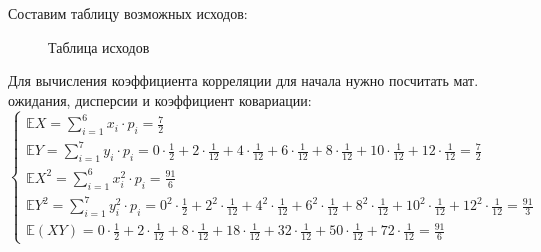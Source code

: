 \documentclass{article}
\begin{document}
\begin{enumerate}
Составим таблицу возможных исходов:
\begin{center}
  \begin{figure}[h]
    \centering
    \caption{Таблица исходов}
  \end{figure}
\end{center}
Для вычисления коэффициента корреляции для начала нужно посчитать мат. ожидания, дисперсии и коэффициент ковариации:
\begin{equation}
  \begin{cases}
    \mathbb{E}X = \sum_{i=1}^{6} x_i \cdot p_i = \frac{7}{2} \\
    \mathbb{E}Y = \sum_{i=1}^{7} y_i \cdot p_i = 0 \cdot \frac{1}{2} + 2 \cdot \frac{1}{12} + 4 \cdot \frac{1}{12} + 6 \cdot \frac{1}{12} + 8 \cdot \frac{1}{12} + 10 \cdot \frac{1}{12} + 12 \cdot \frac{1}{12} = \frac{7}{2} \\
    \mathbb{E}X^2 = \sum_{i=1}^{6} x_i^2 \cdot p_i = \frac{91}{6} \\
    \mathbb{E}Y^2 = \sum_{i=1}^{7} y_i^2 \cdot p_i = 0^2 \cdot \frac{1}{2} + 2^2 \cdot \frac{1}{12} + 4^2 \cdot \frac{1}{12} + 6^2 \cdot \frac{1}{12} + 8^2 \cdot \frac{1}{12} + 10^2 \cdot \frac{1}{12} + 12^2 \cdot \frac{1}{12} = \frac{91}{3} \\
    \mathbb{E}(XY) = 0 \cdot \frac{1}{2} + 2 \cdot \frac{1}{12} + 8 \cdot \frac{1}{12} + 18 \cdot \frac{1}{12} + 32 \cdot \frac{1}{12} + 50 \cdot \frac{1}{12} + 72 \cdot \frac{1}{12} = \frac{91}{6}

\end{cases}
\end{equation}
\end{enumerate}
\end{document}
